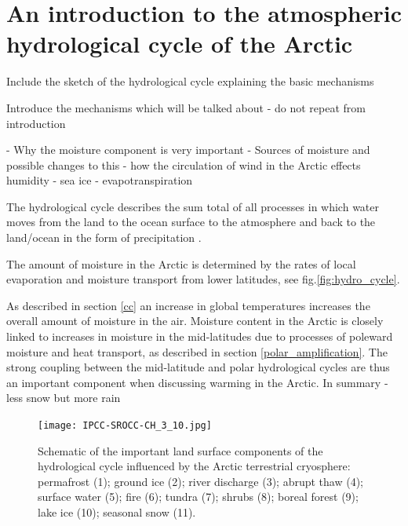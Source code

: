 \documentclass[11pt, oneside]{article}
\begin{document}
\section{An introduction to the atmospheric hydrological cycle of the Arctic}
Include the sketch of the hydrological cycle explaining the basic mechanisms

Introduce the mechanisms which will be talked about - do not repeat from introduction

{\color{blue}- Why the moisture component is very important 
- Sources of moisture and possible changes to this }
{\color{blue}-  how the circulation of wind in the Arctic effects humidity 
- sea ice 
- evapotranspiration }

The hydrological cycle describes the sum total of all processes in which water moves from the land to the ocean surface to the atmosphere and back to the land/ocean in the form of precipitation \cite{CHAKRAVARTY2019203}. 

The amount of moisture in the Arctic is determined by the rates of local evaporation and moisture transport from lower latitudes, see fig.\ref{fig:hydro_cycle}. 


As described in section \ref{cc} an increase in global temperatures increases the overall amount of moisture in the air. Moisture content in the Arctic is closely linked to increases in moisture in the mid-latitudes due to processes of poleward moisture and heat transport, as described in section \ref{polar_amplification}. The strong coupling between the mid-latitude and polar hydrological cycles are thus an important component when discussing warming in the Arctic.   
{\color{blue} In summary - less snow but more rain }

\begin{figure}[h!]
\centering
\texttt{[image: IPCC-SROCC-CH\_3\_10.jpg]}
\caption{Schematic of the important land surface components of the hydrological cycle influenced by the Arctic terrestrial cryosphere: permafrost (1); ground ice (2); river discharge (3); abrupt thaw (4); surface water (5); fire (6); tundra (7); shrubs (8); boreal forest (9); lake ice (10); seasonal snow (11). \cite{ipcc}}\label{fig:hydro}
\end{figure}
\end{document}
